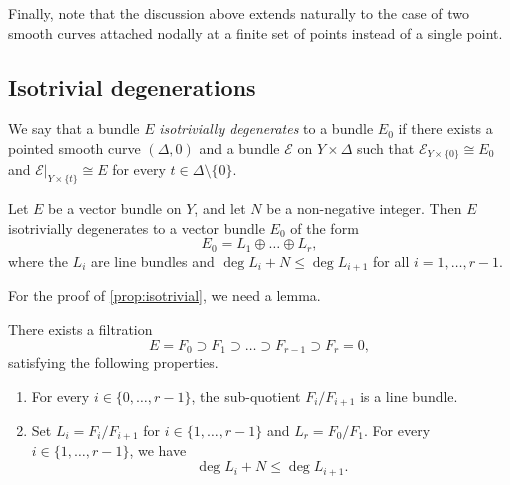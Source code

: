 \documentclass[11 pt]{amsart}
\numberwithin{equation}{section}
\begin{document}
Finally, note that the discussion above extends naturally to the case of two smooth curves attached nodally at a finite set of points instead of a single point.

\subsection{Isotrivial degenerations}
We say that a bundle $E$ \emph{isotrivially degenerates} to a bundle $E_0$ if there exists a pointed smooth curve $(\Delta, 0)$ and a bundle ${\mathcal E}$ on $Y \times \Delta$ such that ${\mathcal E}_{Y \times \{0\}} \cong E_0$ and ${\mathcal E}\big|_{Y \times \{t\}} \cong E$ for every $t \in \Delta \setminus \{0\}$.

\begin{proposition}
  \label{prop:isotrivial}
  Let $E$ be a vector bundle on $Y$, and let $N$ be a non-negative integer.
  Then $E$ isotrivially degenerates to a vector bundle $E_0$ of the form
  \[ E_0 = L_1 \oplus \dots \oplus L_r,\]
  where the $L_i$ are line bundles and $\deg L_i + N \leq \deg L_{i+1}$ for all $i = 1, \dots, r-1$.
\end{proposition}
For the proof of \autoref{prop:isotrivial}, we need a lemma.
\begin{lemma}
  \label{lem:filtration}
  There exists a filtration
  \[ E = F_{0} \supset F_{1} \supset \dots \supset F_{r-1} \supset F_{r} = 0,\]
  satisfying the following properties.
  \begin{enumerate}
  \item\label{filt1} For every $i \in \{0, \dots, r-1\}$, the sub-quotient $F_{i}/F_{i+1}$ is a line bundle.
  \item\label{filt2} Set $L_i = F_{i}/F_{i+1}$ for $i \in \{1, \dots, r-1\}$ and $L_r = F_0/F_1$.
    For every $i \in \{1, \dots, r-1\}$, we have
    \[\deg L_i + N \leq \deg L_{i+1}.\]
  \end{enumerate}
\end{lemma}
\end{document}
